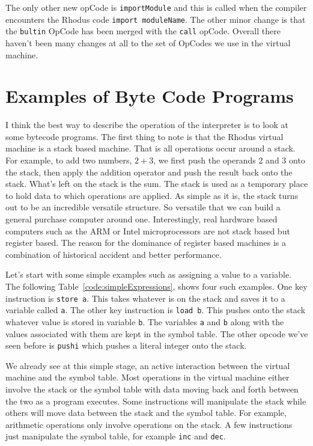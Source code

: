 The only other new opCode is {\tt importModule} and this is called when the compiler encounters the Rhodus code {\tt import moduleName}. The other minor change is that the {\tt bultin} OpCode has been merged with the {\tt call} opCode. Overall there haven't been many changes at all to the set of OpCodes we use in the virtual machine.


\section{Examples of Byte Code Programs}

I think the best way to describe the operation of the interpreter is to look at some bytecode programs. The first thing to note is that the Rhodus virtual machine is a stack based machine. That is all operations occur around a stack. For example, to add two numbers, $2 + 3$, we first push the operands 2 and 3 onto the stack, then apply the addition operator and push the result back onto the stack. What's left on the stack is the sum. The stack is used as a temporary place to hold data to which operations are applied. As simple as it is, the stack turns out to be an incredible versatile structure. So versatile that we can build a general purchase computer around one. Interestingly, real hardware based computers such as the ARM or Intel microprocessors are not stack based but register based. The reason for the dominance of register based machines is a combination of historical accident and better performance.

Let's start with some simple examples such as assigning a value to a variable. The following Table~\ref{code:simpleExpressions}, shows four such examples. One key instruction is {\tt store a}. This takes whatever is on the stack and saves it to a variable called {\tt a}. The other key instruction is {\tt load b}. This pushes onto the stack whatever value is stored in variable {\tt b}. The variables {\tt a} and {\tt b} along with the values associated with them are kept in the symbol table. The other opcode we've seen before is {\tt pushi} which pushes a literal integer onto the stack. 

We already see at this simple stage, an active interaction between the virtual machine and the symbol table. Most operations in the virtual machine either involve the stack or the symbol table with data moving back and forth between the two as a program executes. Some instructions will manipulate the stack while others will move data between the stack and the symbol table. For example, arithmetic operations only involve operations on the stack. A few instructions just manipulate the symbol table, for example {\tt inc} and {\tt dec}.

